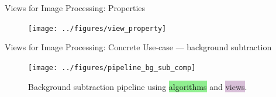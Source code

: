 \documentclass[12pt,aspectratio=169]{beamer}
\begin{document}
\begin{frame}[fragile]{Views for Image Processing: Properties}
  \centering
  \begin{figure}
    \texttt{[image: ../figures/view\_property]}
  \end{figure}
\end{frame}

\begin{frame}[fragile]{Views for Image Processing: Concrete Use-case --- background subtraction}
  \begin{figure}[htbp]
    \centering
    \texttt{[image: ../figures/pipeline\_bg\_sub\_comp]}
    \caption{Background subtraction pipeline using \colorbox{lightgreen}{algorithms} and
      \colorbox{thistle}{views}.}
  \end{figure}
\end{frame}
\end{document}
